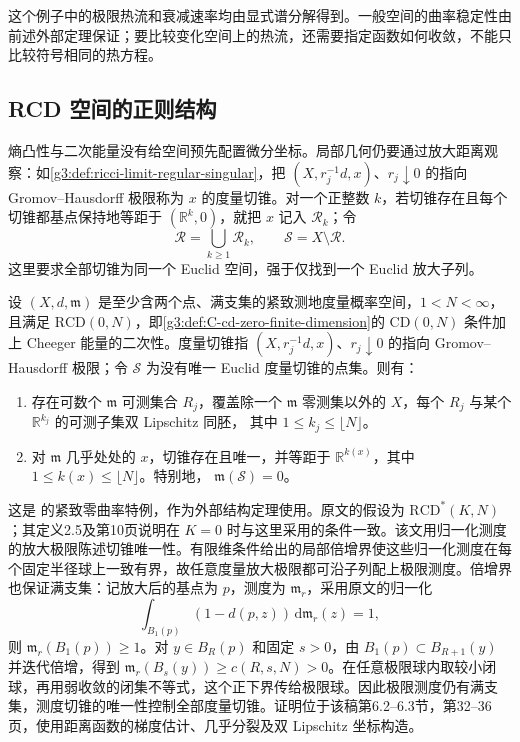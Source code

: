 这个例子中的极限热流和衰减速率均由显式谱分解得到。一般空间的曲率稳定性由前述外部定理保证；要比较变化空间上的热流，还需要指定函数如何收敛，不能只比较符号相同的热方程。

\subsection{RCD 空间的正则结构}
\label{g3:subsec:C03:04}

熵凸性与二次能量没有给空间预先配置微分坐标。局部几何仍要通过放大距离观察：如\cref{g3:def:ricci-limit-regular-singular}，把
\((X,r_j^{-1}d,x)\)、\(r_j\downarrow0\) 的指向 Gromov--Hausdorff 极限称为 \(x\) 的度量切锥。对一个正整数 \(k\)，若切锥存在且每个切锥都基点保持地等距于 \((\mathbb R^k,0)\)，就把 \(x\) 记入 \(\mathcal R_k\)；令
\[
	\mathcal R=\bigcup_{k\ge1}\mathcal R_k,\qquad
	\mathcal S=X\setminus\mathcal R.
\]
这里要求全部切锥为同一个 Euclid 空间，强于仅找到一个 Euclid 放大子列。

\begin{theorem}
\label{g3:thm:C-finite-rcd-regularity}
	设 \((X,d,\mathfrak m)\) 是至少含两个点、满支集的紧致测地度量概率空间，\(1<N<\infty\)，且满足 \(\mathrm{RCD}(0,N)\)，即\cref{g3:def:C-cd-zero-finite-dimension}的 \(\mathrm{CD}(0,N)\) 条件加上 Cheeger 能量的二次性。度量切锥指 \((X,r_j^{-1}d,x)\)、\(r_j\downarrow0\) 的指向 Gromov--Hausdorff 极限；令 \(\mathcal S\) 为没有唯一 Euclid 度量切锥的点集。则有：
	\begin{enumerate}
		\item 存在可数个 \(\mathfrak m\) 可测集合 \(R_j\)，覆盖除一个
		      \(\mathfrak m\) 零测集以外的 \(X\)，每个 \(R_j\) 与某个
		      \(\mathbb R^{k_j}\) 的可测子集双 Lipschitz 同胚，
		      其中 \(1\le k_j\le\lfloor N\rfloor\)。
		\item 对 \(\mathfrak m\) 几乎处处的 \(x\)，切锥存在且唯一，并等距于
		      \(\mathbb R^{k(x)}\)，其中
		      \(1\le k(x)\le\lfloor N\rfloor\)。特别地，
		      \(\mathfrak m(\mathcal S)=0\)。
	\end{enumerate}
\end{theorem}

这是 \cite[定理1.1、推论1.2，2017年作者稿第3页]{MondinoNaber2019Structure}的紧致零曲率特例，作为外部结构定理使用。原文的假设为
\(\mathrm{RCD}^*(K,N)\)；其定义2.5及第10页说明在 \(K=0\) 时与这里采用的条件一致。该文用归一化测度的放大极限陈述切锥唯一性。有限维条件给出的局部倍增界使这些归一化测度在每个固定半径球上一致有界，故任意度量放大极限都可沿子列配上极限测度。倍增界也保证满支集：记放大后的基点为 \(p\)，测度为 \(\mathfrak m_r\)，采用原文的归一化
\[
	\int_{B_1(p)}(1-d(p,z))\,\mathrm d\mathfrak m_r(z)=1,
\]
则 \(\mathfrak m_r(B_1(p))\ge1\)。对 \(y\in B_R(p)\) 和固定 \(s>0\)，由
\(B_1(p)\subset B_{R+1}(y)\) 并迭代倍增，得到
\(\mathfrak m_r(B_s(y))\ge c(R,s,N)>0\)。在任意极限球内取较小闭球，再用弱收敛的闭集不等式，这个正下界传给极限球。因此极限测度仍有满支集，测度切锥的唯一性控制全部度量切锥。证明位于该稿第6.2--6.3节，第32--36页，使用距离函数的梯度估计、几乎分裂及双 Lipschitz 坐标构造。

